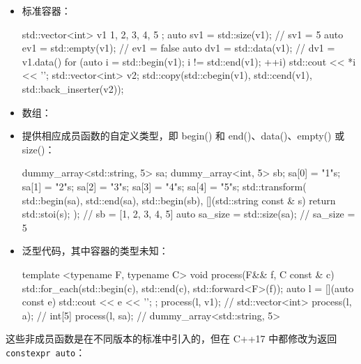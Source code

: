 \begin{itemize}
\item
标准容器：

\begin{cpp}
std::vector<int> v1{ 1, 2, 3, 4, 5 };
auto sv1 = std::size(v1);  // sv1 = 5
auto ev1 = std::empty(v1); // ev1 = false
auto dv1 = std::data(v1);  // dv1 = v1.data()
for (auto i = std::begin(v1); i != std::end(v1); ++i)
    std::cout << *i << '\n';
std::vector<int> v2;
std::copy(std::cbegin(v1), std::cend(v1),
          std::back_inserter(v2));
\end{cpp}

\item
数组：


\item
提供相应成员函数的自定义类型，即 begin() 和 end()、data()、empty() 或 size()：

\begin{cpp}
dummy_array<std::string, 5> sa;
dummy_array<int, 5> sb;
sa[0] = "1"s;
sa[1] = "2"s;
sa[2] = "3"s;
sa[3] = "4"s;
sa[4] = "5"s;
std::transform(
    std::begin(sa), std::end(sa),
    std::begin(sb),
    [](std::string const & s) {return std::stoi(s); });
// sb = [1, 2, 3, 4, 5]
auto sa_size = std::size(sa); // sa_size = 5
\end{cpp}

\item
泛型代码，其中容器的类型未知：

\begin{cpp}
template <typename F, typename C>
void process(F&& f, C const & c)
{
    std::for_each(std::begin(c), std::end(c),
    std::forward<F>(f));
}
auto l = [](auto const e) {std::cout << e << '\n'; };
process(l, v1); // std::vector<int>
process(l, a);  // int[5]
process(l, sa); // dummy_array<std::string, 5>
\end{cpp}

\end{itemize}


这些非成员函数是在不同版本的标准中引入的，但在 C++17 中都修改为返回 \verb|constexpr auto|：

